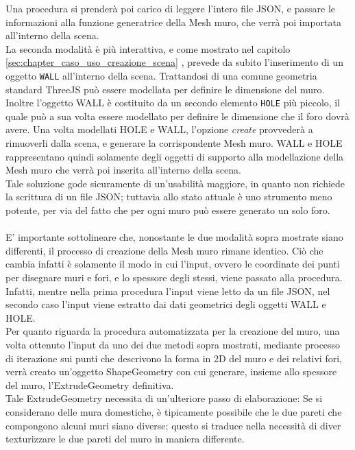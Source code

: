 Una procedura si prenderà poi carico di leggere l’intero file JSON, e passare le informazioni alla funzione generatrice della Mesh muro, che verrà poi importata all’interno della scena.
\\
La seconda modalità è più interattiva, e come mostrato nel capitolo \ref{sec:chapter_caso_uso_creazione_scena} , prevede da subito l’inserimento di un oggetto \texttt{WALL} all’interno della scena. Trattandosi di una comune geometria standard ThreeJS può essere modellata per definire le dimensione del muro. Inoltre l’oggetto WALL è costituito da un secondo elemento \texttt{HOLE} più piccolo, il quale può a sua volta essere modellato per definire le dimensione che il foro dovrà avere. Una volta modellati HOLE e WALL, l’opzione \emph{create} provvederà a rimuoverli dalla scena, e generare la corrispondente Mesh muro. WALL e HOLE rappresentano quindi solamente degli oggetti di supporto alla modellazione della Mesh muro che verrà poi inserita all’interno della scena.
\\
Tale soluzione gode sicuramente di un’usabilità maggiore, in quanto non richiede la scrittura di un file JSON; tuttavia allo stato attuale è uno strumento meno potente, per via del fatto che per ogni muro può essere generato un solo foro. 
\\
\\
E’ importante sottolineare che, nonostante le due modalità sopra mostrate siano differenti, il processo di creazione della Mesh muro rimane identico. Ciò che cambia infatti è solamente il modo in cui l’input, ovvero le coordinate dei punti per disegnare muri e fori, e lo spessore degli stessi, viene passato alla procedura. Infatti, mentre nella prima procedura l’input viene letto da un file JSON, nel secondo caso l’input viene estratto dai dati geometrici degli oggetti WALL e HOLE.
\\ 
Per quanto riguarda la procedura automatizzata per la creazione del muro, una volta ottenuto l’input da uno dei due metodi sopra mostrati, mediante processo di iterazione sui punti che descrivono la forma in 2D del muro e dei relativi fori, verrà creato un’oggetto ShapeGeometry con cui generare, insieme allo spessore del muro, l’ExtrudeGeometry definitiva.
\\ 
Tale ExtrudeGeometry necessita di un’ulteriore passo di elaborazione:
Se si considerano delle mura domestiche, è tipicamente possibile che le due pareti che compongono alcuni muri siano diverse; questo si traduce nella necessità di diver texturizzare le due pareti del muro in maniera differente.
